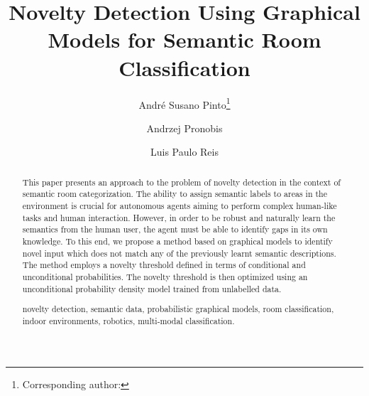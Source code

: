 \documentclass[runningheads,a4paper]{llncs}
\newcommand{\keywords}[1]{\par\addvspace\baselineskip
\noindent\keywordname\enspace\ignorespaces#1}
\begin{document}
\mainmatter  %

\title{Novelty Detection Using Graphical Models for Semantic Room Classification}


%
\author{André Susano Pinto\thanks{Corresponding author: } \and Andrzej Pronobis \and Luis Paulo Reis}
%


\maketitle


\begin{abstract}
This paper presents an approach to the problem of novelty
detection in the context of semantic room categorization.
The ability to assign semantic labels to areas in the environment is crucial for
autonomous agents aiming to perform complex human-like tasks and human
interaction.
However, in order to be robust and naturally learn the semantics from
the human user, the agent must be able to identify gaps in its own knowledge.
To this end, we propose a method based on graphical models to identify novel
input which does not match any of the previously learnt semantic descriptions.
The method employs a novelty threshold defined in terms of conditional
and unconditional probabilities. The novelty threshold is then optimized using
an unconditional probability density model trained from unlabelled data.


\keywords{novelty detection, semantic data, probabilistic graphical models,
room classification, indoor environments, robotics, multi-modal classification.}
\end{abstract}
\end{document}
